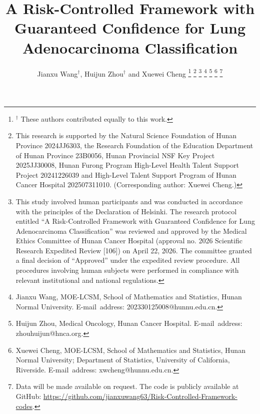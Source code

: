 \documentclass[journal,twoside,web]{ieeecolor}
\begin{document}
\title{A Risk-Controlled Framework with Guaranteed Confidence for Lung Adenocarcinoma Classification}
\author{Jianxu Wang$^{\dagger}$, Huijun Zhou$^{\dagger}$ and Xuewei Cheng
\thanks{$^{\dagger}$ These authors contributed equally to this work.}
\thanks{This research is supported by the Natural Science Foundation of Hunan Province 2024JJ6303, the Research Foundation of the Education Department of Hunan Province 23B0056, Hunan Provincial NSF Key Project 2025JJ30008, Hunan Furong Program High-Level Health Talent Support Project 20241226039 and High-Level Talent Support Program of Hunan Cancer Hospital 202507311010. (Corresponding author: Xuewei Cheng.)}
\thanks{This study involved human participants and was conducted in accordance with the principles of the Declaration of Helsinki. The research protocol entitled “A Risk-Controlled Framework with Guaranteed Confidence for Lung Adenocarcinoma Classification” was reviewed and approved by the Medical Ethics Committee of Hunan Cancer Hospital (approval no. 2026 Scientific Research Expedited Review [106]) on April 22, 2026. The committee granted a final decision of “Approved” under the expedited review procedure. All procedures involving human subjects were performed in compliance with relevant institutional and national regulations.}
\thanks{Jianxu Wang, MOE-LCSM, School of Mathematics and Statistics, Hunan Normal University. E-mail~address: 202330125008@hunnu.edu.cn.}
\thanks{Huijun Zhou, Medical Oncology, Hunan Cancer Hospital. E-mail~address: zhouhuijun@hnca.org.}
\thanks{Xuewei Cheng, MOE-LCSM, School of Mathematics and Statistics, Hunan Normal University; Department of Statistics, University of California, Riverside. E-mail~address: xwcheng@hunnu.edu.cn.}
\thanks{Data will be made available on request. The code is publicly available at GitHub: \url{https://github.com/jianxuwang63/Risk-Controlled-Framework-codes}.}
}

\maketitle
\end{document}
